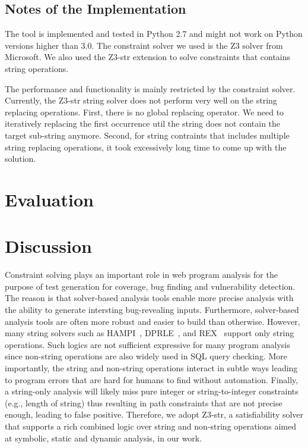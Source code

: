 \documentclass[conference]{IEEEtran}
\begin{document}
\subsection{Notes of the Implementation}

The tool is implemented and tested in Python 2.7 and might not work on Python versions higher than 3.0.
The constraint solver we used is the Z3 solver from Microsoft. We also used the Z3-str extension to solve constraints that contains string operations.

The performance and functionality is mainly restricted by the constraint solver. Currently, the Z3-str string solver does not perform very well on the string replacing operations. First, there is no global replacing operator. We need to iteratively replacing the first occurrence util the string does not contain the target sub-string anymore. Second, for string contraints that includes multiple string replacing operations, it took excessively long time to come up with the solution.


\section{Evaluation}
\label{evaluation}

\section{Discussion}
\label{discussion}
Constraint solving plays an important role in web program analysis for the purpose of test generation for coverage, bug finding and vulnerability detection. The reason is that solver-based analysis tools enable more precise analysis with the ability to generate intersting bug-revealing inputs. Furthermore, solver-based analysis tools are often more robust and easier to build than otherwise. However, many string solvers such as HAMPI~\cite{hampi}, DPRLE~\cite{dprle}, and REX~\cite{rex} support only string operations. Such logics are not sufficient expressive for many program analysis since non-string operations are also widely used in SQL query checking. More importantly, the string and non-string operations interact in subtle ways leading to program errors that are hard for humans to find without automation. Finally, a string-only analysis will likely miss pure integer or string-to-integer constraints (e.g., length of string) thus resulting in path constraints that are not precise enough, leading to false positive. Therefore, we adopt Z3-str, a satisfiability solver that supports a rich combined logic over string and non-string operations aimed at symbolic, static and dynamic analysis, in our work.
\end{document}
